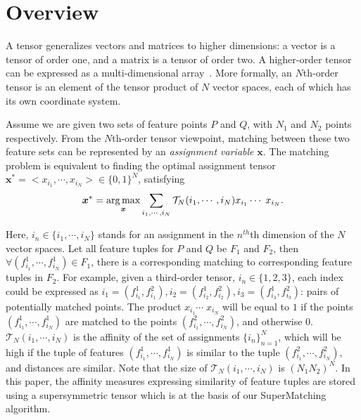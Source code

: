 \section{Overview}
\label{sec:overview}

A tensor generalizes vectors and matrices to higher dimensions: a vector is a tensor of order one,
and a matrix is a tensor of order two. A higher-order tensor can be expressed as a multi-dimensional array~\cite{Kolda08}.
More formally, an $N$th-order tensor is an element of the tensor product of $N$ vector spaces, each of which has its own coordinate system.

Assume we are given two sets of feature points $P$ and $Q$, with $N_1$ and $N_2$ points respectively.
From the $N$th-order tensor viewpoint,  matching between these two feature sets can be represented by an \emph{assignment variable} $\boldsymbol{x}$.
The matching problem is equivalent to finding the optimal assignment tensor ${\boldsymbol{x}}^*=<x_{i_1},\cdots,x_{i_N}>
 \in \{0,1\}^{N}$, satisfying~\cite{Kolda08,Duchenne09}
\begin{equation}
\label{equ:assigment}
  {\boldsymbol{x}}^* = \operatorname*{arg\,max}_{\boldsymbol{x}}  \sum_{i_1,\cdots,i_N} \mathcal{T}_N(i_1,\cdots,i_N) x_{i_1}  \cdots\; x_{i_N}.
\end{equation}

Here, $i_n \in \{i_1,\cdots ,i_N\}$ stands for an assignment in the $n^{th}$th dimension of the $N$ vector spaces.
Let all feature tuples for $P$ and $Q$ be $F_1$ and $F_2$, then $\forall (f_{i_1}^1, \cdots, f_{i_N}^1)\in F_1$,
there is a corresponding matching to corresponding feature tuples in $F_2$.
For example, given a third-order tensor, $i_n \in \{1,2,3\}$,
each index could be expressed as $i_1=(f_{i_1}^1,f_{i_1}^2), i_2=(f_{i_2}^1,f_{i_2}^2), i_3=(f_{i_3}^1,f_{i_3}^2)$: pairs of potentially matched points.
The product $x_{i_1} \cdots\;x_{i_N}$ will be equal to $1$ if the points $(f_{i_1}^1, \cdots, f_{i_N}^1)$ are matched to the points $(f_{i_1}^2, \cdots, f_{i_N}^2)$,
and otherwise 0.
$\mathcal{T}_N(i_1,\cdots,i_N)$ is the affinity of the set of assignments $\{i_n\}_{n=1}^N$,
which will be high if the tuple of features $(f_{i_1}^1, \cdots, f_{i_N}^1)$  is similar to the tuple $(f_{i_1}^2, \cdots, f_{i_N}^2)$, and distances are similar.
Note that the size of $\mathcal{T}_N(i_1,\cdots,i_N)$ is ${(N_1N_2)}^N$.
In this paper, the affinity measures expressing similarity of feature tuples are stored using a supersymmetric tensor which is at the basis of our SuperMatching algorithm.

